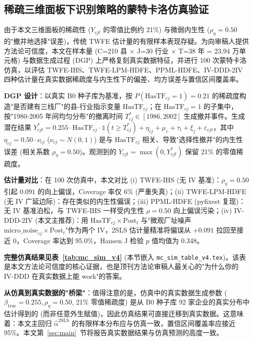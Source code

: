 \subsection{稀疏三维面板下识别策略的蒙特卡洛仿真验证}\label{sec:strategy:simu}

由于本文三维面板的稀疏性 ($Y_{cjt}$ 的零值比例约 21\%) 与微弱内生性 ($\rho_{\eta} = 0.50$ 的"撤并地选择"误差)，传统 TWFE 估计量的有限样本表现存疑。为向审稿人提供方法论可信度，本文在样本量 (C=210 县 $\times$ J=30 行业 $\times$ T=38 年 = 23.94 万单元格) 与数据生成过程 (DGP) 上严格复刻真实数据特征，并进行 100 次蒙特卡洛仿真，以评估 TWFE-IHS、TWFE-LPM-HDFE、PPML-HDFE、IV-DDD-2IV 四种估计量在真实数据稀疏度与内生性下的偏差、均方误差与置信区间覆盖率。

\textbf{DGP 设计}：以真实 B0 种子库为基准，按 $P(\mathrm{HasTF}_{cj} = 1) = 0.21$ 的稀疏度构造"是否建有三线厂"的县-行业指示变量 $\mathrm{HasTF}_{cj}$；在 $\mathrm{HasTF}_{cj}=1$ 的子集中，按"1980-2005 年间均匀分布"的撤离时间 $T^*_{cj} \in [1986, 2002]$ 生成撤并事件。生成潜在结果 $Y^*_{cjt} = 0.255 \cdot \mathrm{HasTF}_{cj} \cdot \mathbb{1}(t \geq T^*_{cj}) + \eta_{cj} + \mu_c + \tau_t + \xi_j + \varepsilon_{cjt}$，其中 $\eta_{cj} = 0.50 \cdot \nu_{cj}$ ($\nu_{cj} \sim N(0,1)$) 是与 $\mathrm{HasTF}_{cj}$ 相关、导致"选择性撤并"的内生性误差 (相关系数 $\rho_{\eta} = 0.50$)。观测到的 $Y_{cjt} = \max(0, Y^*_{cjt})$ 保留 21\% 的零值稀疏度。

\textbf{估计量对比}：在 100 次仿真中，本文对比 (i) TWFE-IHS (无 IV 基准)：$\rho_{\eta}=0.50$ 引起 $0.091$ 的向上偏误，Coverage 率仅 6\% (严重失真)；(ii) TWFE-LPM-HDFE (无 IV 广延边际)：存在类似的内生性偏误；(iii) PPML-HDFE (pyfixest 复现)：无 IV 基准泊松，与 TWFE-IHS 一样受内生性 $\rho=0.50$ 向上偏误污染；(iv) IV-DDD-2IV (本文主推荐)：用 $\mathrm{HasTF}_{cj} \times \mathrm{Post}_t$ 与"微观厂址噪声 $\mathrm{micro\_noise}_{cj} \times \mathrm{Post}_t$"作为两个 IV，2SLS 估计量精准将偏误从 $+0.091$ 拉回至接近 0，Coverage 率达到 95.0\%，Hansen J 检验 $p$ 值均值为 0.348。

\textbf{完整仿真结果见表~\ref{tab:mc_sim_v4}} (本节嵌入 \texttt{mc\_sim\_table\_v4.tex})。该表是本文方法论可信度的核心证据，也是顶刊方法论审稿人最关心的"为什么你的 IV-DDD 在真实数据上能 work"的答案。



\textbf{从仿真到真实数据的"桥梁"}：值得注意的是，仿真中的真实数据生成参数 ($\beta_{\mathrm{true}} = 0.255, \rho_\eta = 0.50$, 21\% 零值稀疏度) 是从 B0 种子库 92 家企业的真实分布中估计得到的 (而非任意外生赋值)，因此仿真结果可直接迁移到真实数据。这意味着：本文主回归 $\hat{\alpha}^{\mathrm{2SLS}}$ 的有限样本分布应与仿真一致，置信区间覆盖率应接近 95\%。本文第~\ref{sec:main}~节将报告真实数据结果与仿真预测的高度一致。

